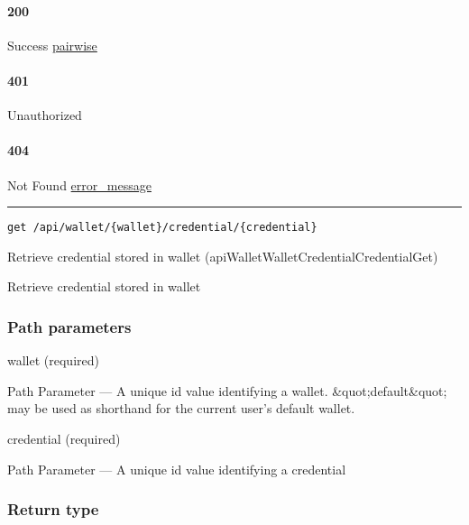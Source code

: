 \hypertarget{section-441}{%
\paragraph{200}\label{section-441}}

Success \protect\hyperlink{pairwise}{pairwise}

\hypertarget{section-442}{%
\paragraph{401}\label{section-442}}

Unauthorized \protect\hyperlink{}{}

\hypertarget{section-443}{%
\paragraph{404}\label{section-443}}

Not Found \protect\hyperlink{error_message}{error\_message}

\begin{center}\rule{0.5\linewidth}{\linethickness}\end{center}

\protect\hypertarget{apiWalletWalletCredentialCredentialGet}{}{}

\begin{verbatim}
get /api/wallet/{wallet}/credential/{credential}
\end{verbatim}

Retrieve credential stored in wallet
({apiWalletWalletCredentialCredentialGet})

Retrieve credential stored in wallet

\hypertarget{path-parameters-72}{%
\subsubsection{Path parameters}\label{path-parameters-72}}

wallet (required)

{Path Parameter} --- A unique id value identifying a wallet.
\&quot;default\&quot; may be used as shorthand for the current user's
default wallet.

credential (required)

{Path Parameter} --- A unique id value identifying a credential

\hypertarget{return-type-104}{%
\subsubsection{Return type}\label{return-type-104}}

